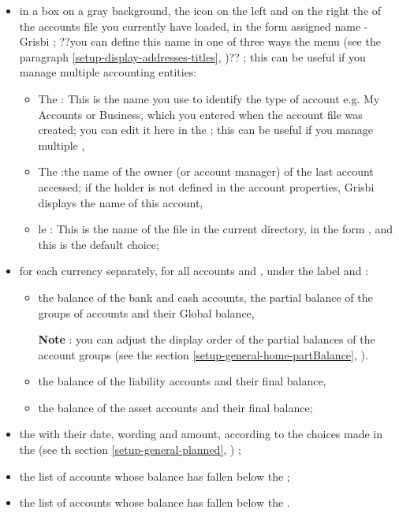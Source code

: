 \begin{itemize}
	 \item in a box on a gray background, the  icon on the left and on the right the  of the accounts file you currently have loaded, in the form  \og assigned name - Grisbi\fg{} ; ??you can define this name in one of three ways the  menu (see the paragraph \vref{setup-display-addresses-titles}, )?? ; this can be useful if you manage multiple accounting entities:

		\begin{itemize}
			 \item The  : This is the name you use to identify the type of account e.g. \og My Accounts \fg{} or \og Business\fg{}, which you entered when the account file was created; you can edit it here in the    ; this can be useful if you manage multiple  , 
			 \item The  :the name of the owner (or  account manager) of the last account accessed; if the holder is not defined in the account properties, Grisbi displays the name of this account,
			 \item le  :  This is the name of the file in the current directory, in the form  , and this is the default choice;
		\end{itemize}
		
	 \item for each currency separately, for all accounts and ,  under the label  and  :
		\begin{itemize}
			 \item the balance of the bank and cash accounts, the partial balance of the groups of accounts and their Global balance,

			 \textbf{Note} : you can adjust the display order of the partial balances of the account groups (see the section \vref{setup-general-home-partBalance}, ).			 
			 \item the balance of the liability accounts and their final balance,
			 \item the balance of the asset accounts and their final balance;
		\end{itemize}
	\item the  with their date, wording and amount, according to the choices made in the  (see th section \vref{setup-general-planned}, ) ;
	\item the list of accounts whose balance has fallen below the   ;
	\item the list of accounts whose balance has fallen below the  .
\end{itemize}

